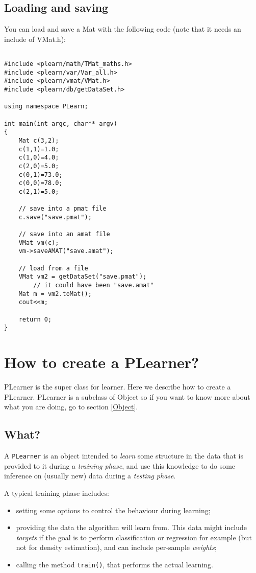 \documentclass[11pt]{book}
\begin{document}
\subsection{Loading and saving}
You can load and save a Mat with the following code (note that it needs an 
include of VMat.h):
\begin{verbatim}

#include <plearn/math/TMat_maths.h>
#include <plearn/var/Var_all.h>
#include <plearn/vmat/VMat.h>
#include <plearn/db/getDataSet.h>

using namespace PLearn;

int main(int argc, char** argv)
{
    Mat c(3,2);
    c(1,1)=1.0;
    c(1,0)=4.0;
    c(2,0)=5.0;
    c(0,1)=73.0;
    c(0,0)=78.0;
    c(2,1)=5.0;

    // save into a pmat file
    c.save("save.pmat");

    // save into an amat file
    VMat vm(c);
    vm->saveAMAT("save.amat");

    // load from a file
    VMat vm2 = getDataSet("save.pmat");
        // it could have been "save.amat"
    Mat m = vm2.toMat();
    cout<<m;

    return 0;
}

\end{verbatim}



\section{How to create a PLearner?}

PLearner is the super class for learner. Here we describe how to create
a PLearner. PLearner is a subclass of Object so if you want to know more
about what you are doing, go to section \ref{Object}.

\subsection{What?}

A {\tt PLearner} is an object intended to {\em learn} some structure in
the data that is provided to it during a {\em training phase}, and use
this knowledge to do some inference on (usually new) data during a {\em
testing phase}.

A typical training phase includes:
\begin{itemize}
  \item setting some options to control the behaviour during learning;

  \item providing the data the algorithm will learn from. This data
  might include {\em targets} if the goal is to perform classification
  or regression for example (but not for density estimation), and can
  include per-sample {\em weights};

  \item calling the method {\tt train()}, that performs the actual learning.
\end{itemize}
\end{document}
